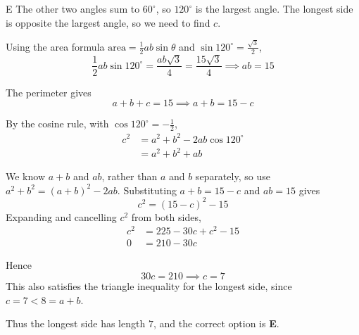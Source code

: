 \documentclass[11pt,a4paper]{article}
\begin{document}
\begin{enumerate}[label=\textbf{\arabic*.},leftmargin=*,itemsep=0pt,start=17]
\begin{djsSolution}{E}
The other two angles sum to $60^\circ$, so $120^\circ$ is the largest angle. The longest side is opposite the largest angle, so we need to find $c$.

Using the area formula $\text{area}=\frac12 ab\sin\theta$ and $\sin120^\circ=\frac{\sqrt3}{2}$,
\[
\frac12 ab\sin120^\circ
=\frac{ab\sqrt3}{4} = \frac{15\sqrt3}{4}
\implies ab=15
\]

The perimeter gives
\[
a+b+c=15 \implies a+b=15-c
\]

By the cosine rule, with $\cos120^\circ=-\frac12$,
\begin{align*}
    c^2&=a^2+b^2-2ab\cos120^\circ\\[5pt]
&=a^2+b^2+ab
\end{align*}

We know $a+b$ and $ab$, rather than $a$ and $b$ separately, so use
$a^2+b^2=(a+b)^2-2ab$. Substituting $a+b=15-c$ and $ab=15$ gives
\[
c^2=(15-c)^2-15
\]
Expanding and cancelling $c^2$ from both sides,
\[
\begin{aligned}
c^2&=225-30c+c^2-15\\[5pt]
0&=210-30c
\end{aligned}
\]

Hence
\[
30c=210 \implies c=7
\]
This also satisfies the triangle inequality for the longest side, since $c=7<8=a+b$.

Thus the longest side has length $7$, and the correct option is \textbf{E}.
\end{djsSolution}
\end{enumerate}
\clearpage
\thispagestyle{djssolutions}
\vspace*{8pt}
\end{document}

